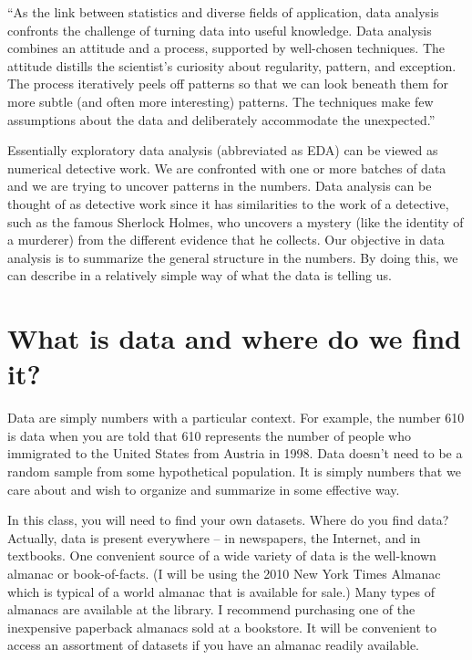 \documentclass[
]{book}
\begin{document}
``As the link between statistics and diverse fields of application, data analysis confronts the challenge of turning data into useful knowledge. Data analysis combines an attitude and a process, supported by well-chosen techniques. The attitude distills the scientist's curiosity about regularity, pattern, and exception. The process iteratively peels off patterns so that we can look beneath them for more subtle (and often more interesting) patterns. The techniques make few assumptions about the data and deliberately accommodate the unexpected.''

Essentially exploratory data analysis (abbreviated as EDA) can be viewed as numerical detective work. We are confronted with one or more batches of data and we are trying to uncover patterns in the numbers. Data analysis can be thought of as detective work since it has similarities to the work of a detective, such as the famous Sherlock Holmes, who uncovers a mystery (like the identity of a murderer) from the different evidence that he collects. Our objective in data analysis is to summarize the general structure in the numbers. By doing this, we can describe in a relatively simple way of what the data is telling us.

\hypertarget{what-is-data-and-where-do-we-find-it}{%
\section{What is data and where do we find it?}\label{what-is-data-and-where-do-we-find-it}}

Data are simply numbers with a particular context. For example, the number 610 is data when you are told that 610 represents the number of people who immigrated to the United States from Austria in 1998. Data doesn't need to be a random sample from some hypothetical population. It is simply numbers that we care about and wish to organize and summarize in some effective way.

In this class, you will need to find your own datasets. Where do you find data? Actually, data is present everywhere -- in newspapers, the Internet, and in textbooks. One convenient source of a wide variety of data is the well-known almanac or book-of-facts. (I will be using the 2010 New York Times Almanac which is typical of a world almanac that is available for sale.) Many types of almanacs are available at the library. I recommend purchasing one of the inexpensive paperback almanacs sold at a bookstore. It will be convenient to access an assortment of datasets if you have an almanac readily available.
\end{document}
